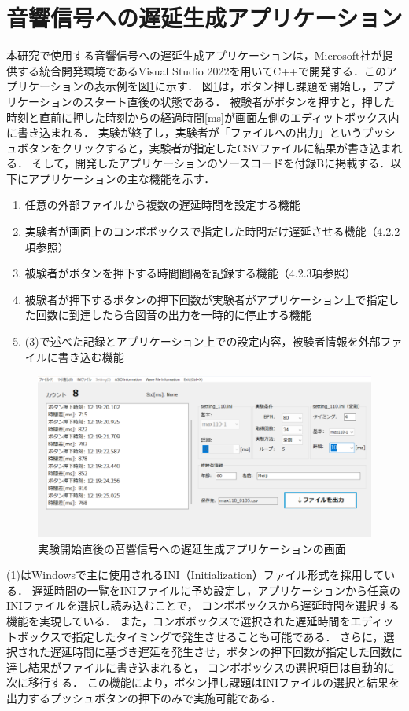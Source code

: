 \section{音響信号への遅延生成アプリケーション}
本研究で使用する音響信号への遅延生成アプリケーションは，Microsoft社が提供する統合開発環境であるVisual Studio 2022を用いてC++で開発する．このアプリケーションの表示例を図\ref{fig:app_kyakkann}に示す．
図\ref{fig:app_kyakkann}は，ボタン押し課題を開始し，アプリケーションのスタート直後の状態である．
被験者がボタンを押すと，押した時刻と直前に押した時刻からの経過時間[ms]が画面左側のエディットボックス内に書き込まれる．
実験が終了し，実験者が「ファイルへの出力」というプッシュボタンをクリックすると，実験者が指定したCSVファイルに結果が書き込まれる．
そして，開発したアプリケーションのソースコードを付録Bに掲載する．以下にアプリケーションの主な機能を示す．
\begin{enumerate}[leftmargin=*]
\item 任意の外部ファイルから複数の遅延時間を設定する機能
\item 実験者が画面上のコンボボックスで指定した時間だけ遅延させる機能（4.2.2項参照）
\item 被験者がボタンを押下する時間間隔を記録する機能（4.2.3項参照）
\item 被験者が押下するボタンの押下回数が実験者がアプリケーション上で指定した回数に到達したら合図音の出力を一時的に停止する機能
\item (3)で述べた記録とアプリケーション上での設定内容，被験者情報を外部ファイルに書き込む機能
\end{enumerate}
\begin{figure}[tb]
  \centering
  \includegraphics[scale=0.4]{figures/Apprication/App_kyakkann.pdf}
  \caption{実験開始直後の音響信号への遅延生成アプリケーションの画面}
  \label{fig:app_kyakkann}
\end{figure}
(1)はWindowsで主に使用されるINI（Initialization）ファイル形式を採用している．
遅延時間の一覧をINIファイルに予め設定し，アプリケーションから任意のINIファイルを選択し読み込むことで，
コンボボックスから遅延時間を選択する機能を実現している．
また，コンボボックスで選択された遅延時間をエディットボックスで指定したタイミングで発生させることも可能である．
さらに，選択された遅延時間に基づき遅延を発生させ，ボタンの押下回数が指定した回数に達し結果がファイルに書き込まれると，
コンボボックスの選択項目は自動的に次に移行する．
この機能により，ボタン押し課題はINIファイルの選択と結果を出力するプッシュボタンの押下のみで実施可能である．
